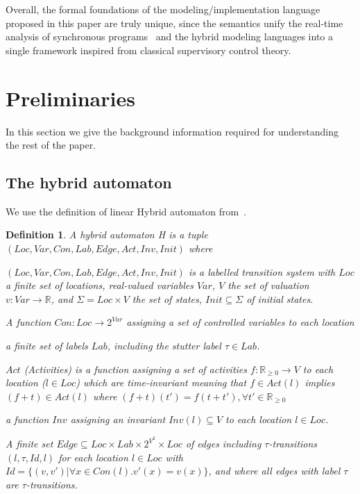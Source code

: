 \documentclass[10pt,journal,cspaper,compsoc]{IEEEtran}
\newtheorem{definition}{Definition}
\begin{document}
Overall, the formal foundations of the modeling/implementation language
proposed in this paper are truly unique, since the semantics unify the
real-time analysis of synchronous programs~\cite{boldt07} and the hybrid
modeling languages into a single framework inspired from classical
supervisory control theory.

\section{Preliminaries}
\label{sec:preliminaries}

In this section we give the background information required for
understanding the rest of the paper.

\subsection{The hybrid automaton}
\label{sec:hybrid-automaton}

We use the definition of linear Hybrid automaton
from~\cite{Henzinger:1996:THA:788018.788803}.

\begin{definition} A \textit{hybrid automaton} \textrm{H} is a tuple
  $(Loc,Var,Con,Lab,Edge,Act,Inv,Init)$ where
  \begin{compactitem}
    
  \item $(Loc,Var,Con,Lab,Edge,Act,Inv,Init)$ is a labelled transition
    system with $Loc$ a finite set of locations, real-valued variables
    $Var$, $V$ the set of valuation $v: Var \rightarrow \mathbb{R}$, and
    $\Sigma = Loc \times V$ the set of states, $Init \subseteq \Sigma$
    of initial states.
    
  \item A function $Con: Loc \rightarrow 2^{Var}$ assigning a set of
    controlled variables to each location
    
  \item a finite set of labels $Lab$, including the stutter label
    $\tau \in Lab$.

  \item $Act$ (Activities) is a function assigning a set of activities
    \mbox{$f: \mathbb{R}_{\geq 0} \rightarrow V$} to each location
    ($l \in Loc$) which are time-invariant meaning that $f \in Act(l)$
    implies \mbox{$(f+t) \in Act(l)$} where
    \mbox{$(f+t)(t') = f(t+t'), \forall t' \in \mathbb{R}_{\geq 0}$}
    
  \item a function $Inv$ assigning an invariant $Inv(l) \subseteq V$ to
    each location $l \in Loc$.
    
  \item A finite set
    $Edge \subseteq Loc \times Lab \times 2^{V^2} \times Loc$ of edges
    including $\tau$-transitions $(l,\tau,Id,l)$ for each location
    $l\in Loc$ with $Id =\{(v,v')|\forall x \in Con(l).v'(x) = v(x)\}$,
    and where all edges with label $\tau$ are $\tau$-transitions.

  \end{compactitem}
\end{definition}
\end{document}
